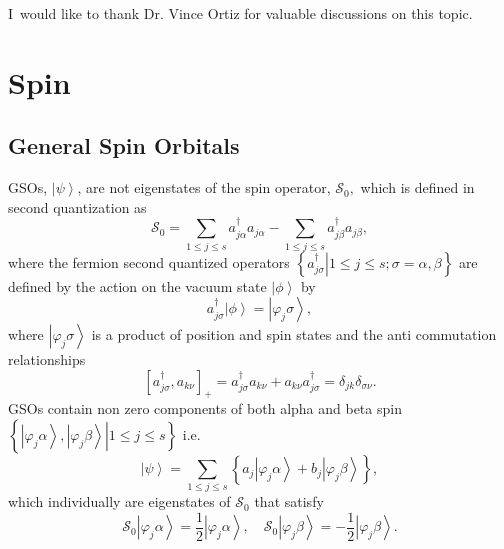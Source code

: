 \documentclass[aps,preprint]{revtex4}%
\begin{document}
I\ would like to thank Dr. Vince Ortiz for valuable discussions on this topic.

\appendix


\section{Spin\label{Spin}}

\subsection{General Spin Orbitals\label{SpinA}}

GSOs, $\left\vert \psi\right\rangle $, are not eigenstates of the spin
operator, $\mathcal{S}_{0},$ which is defined in second quantization as
\begin{equation}
\mathcal{S}_{0}=\sum_{1\leq j\leq s}a_{j\alpha}^{\dagger}a_{j\alpha}%
-\sum_{1\leq j\leq s}a_{j\beta}^{\dagger}a_{j\beta},
\end{equation}
where the fermion second quantized operators $\left\{  \left.  a_{j\sigma
}^{\dagger}\right\vert 1\leq j\leq s;\sigma=\alpha,\beta\right\}  $ are
defined by the action on the vacuum state $\left\vert \phi\right\rangle $ by
\begin{equation}
a_{j\sigma}^{\dagger}\left\vert \phi\right\rangle =\left\vert \varphi
_{j}\sigma\right\rangle ,\nonumber
\end{equation}
where $\left\vert \varphi_{j}\sigma\right\rangle $ is a product of position
and spin states and the anti commutation relationships
\begin{equation}
\left[  a_{j\sigma}^{\dagger},a_{k\nu}\right]  _{+}=a_{j\sigma}^{\dagger
}a_{k\nu}+a_{k\nu}a_{j\sigma}^{\dagger}=\delta_{jk}\delta_{\sigma\nu}.
\end{equation}
GSOs contain non zero components of both alpha and beta spin $\left\{  \left.
\left\vert \varphi_{j}\alpha\right\rangle ,\left\vert \varphi_{j}%
\beta\right\rangle \right\vert 1\leq j\leq s\right\}  $ i.e.%
\begin{equation}
\left\vert \psi\right\rangle =\sum_{1\leq j\leq s}\left\{  a_{j}\left\vert
\varphi_{j}\alpha\right\rangle +b_{j}\left\vert \varphi_{j}\beta\right\rangle
\right\}  ,
\end{equation}
which individually are eigenstates of $\mathcal{S}_{0}$ that satisfy
\begin{equation}
\mathcal{S}_{0}\left\vert \varphi_{j}\alpha\right\rangle =\frac{1}%
{2}\left\vert \varphi_{j}\alpha\right\rangle ,\quad\mathcal{S}_{0}\left\vert
\varphi_{j}\beta\right\rangle =-\frac{1}{2}\left\vert \varphi_{j}%
\beta\right\rangle .
\end{equation}
\end{document}
